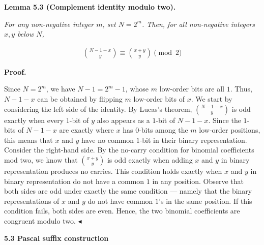 \documentclass[10pt,a4paper]{article}
\begin{document}


\par\medskip\noindent\textbf{
\textbf{Lemma 5.3}\textbf{ }(Complement identity modulo two)\textbf{.}
}\par



\emph{For any non-negative integer $m$, set $N=2^{m}$. Then, for all non-negative integers $x,y$ below $N$,}\par


\[\begin{gathered}
\binom{N-1-x}{y}\equiv\binom{x+y}{y}\pmod{2}
\end{gathered}\]







\par\medskip\noindent\textbf{Proof.}\par




Since $N=2^{m}$, we have $N-1=2^{m}-1$, whose $m$ low-order bits are all $1$. Thus, $N-1-x$ can be obtained by flipping $m$ low-order bits of $x$.
We start by considering the left side of the identity. By Lucas’s theorem, $\binom{N-1-x}{y}$ is odd exactly when every $1$-bit of $y$ also appears as a $1$-bit of $N-1-x$. Since the $1$-bits of $N-1-x$ are exactly where $x$ has $0$-bits among the $m$ low-order positions, this means that $x$ and $y$ have no common $1$-bit in their binary representation.
Consider the right-hand side. By the no-carry condition for binomial coefficients mod two, we know that $\binom{x+y}{y}$ is odd exactly when adding $x$ and $y$ in binary representation produces no carries. This condition holds exactly when $x$ and $y$ in binary representation do not have a common $1$ in any position.
Observe that both sides are odd under exactly the same condition — namely that the binary representations of $x$ and $y$ do not have common $1$’s in the same position. If this condition fails, both sides are even. Hence, the two binomial coefficients are congruent modulo two.
$\blacktriangleleft$\par






\par\medskip\noindent\textbf{
5.3 Pascal suffix construction}\par
\end{document}
